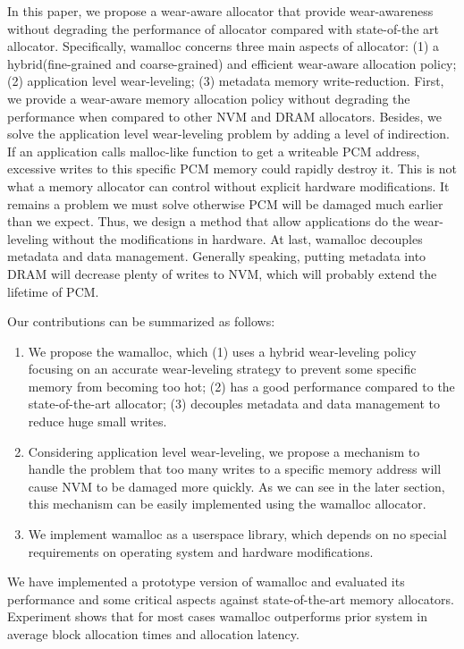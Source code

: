 \documentclass{vldb}
\begin{document}
In this paper, we propose a wear-aware allocator that provide wear-awareness without degrading the performance of allocator compared with state-of-the art allocator. 
Specifically, wamalloc concerns three main aspects of allocator:
(1) a hybrid(fine-grained and coarse-grained) and efficient wear-aware allocation policy;
(2) application level wear-leveling;
(3) metadata memory write-reduction.
First, we provide a wear-aware memory allocation policy without degrading the performance when compared to other NVM and DRAM allocators.
Besides, we solve the application level wear-leveling problem by adding a level of indirection.
If an application calls malloc-like function to get a writeable PCM address, excessive writes to this specific PCM memory could rapidly destroy it. 
This is not what a memory allocator can control without explicit hardware modifications.
It remains a problem we must solve otherwise PCM will be damaged much earlier than we expect.
Thus, we design a method that allow applications do the wear-leveling without the modifications in hardware.
At last, wamalloc decouples metadata and data management.
Generally speaking, putting metadata into DRAM will decrease plenty of writes to NVM, which will probably extend the lifetime of PCM.

Our contributions can be summarized as follows:
\begin{enumerate}
    \item We propose the wamalloc, which
        (1) uses a hybrid wear-leveling policy focusing on an accurate wear-leveling strategy to prevent some specific memory from becoming too hot;
        (2) has a good performance compared to the state-of-the-art allocator;
        (3) decouples metadata and data management to reduce huge small writes.
    \item Considering application level wear-leveling, 
        we propose a mechanism to handle the problem that too many writes to a specific memory address will cause NVM to be damaged more quickly.
        As we can see in the later section, this mechanism can be easily implemented using the wamalloc allocator.
    \item We implement wamalloc as a userspace library, which depends on no special requirements on operating system and hardware modifications.
\end{enumerate}

We have implemented a prototype version of wamalloc and evaluated its performance and some critical aspects against state-of-the-art memory allocators. 
Experiment shows that for most cases wamalloc outperforms prior system in average block allocation times and allocation latency.
\end{document}
